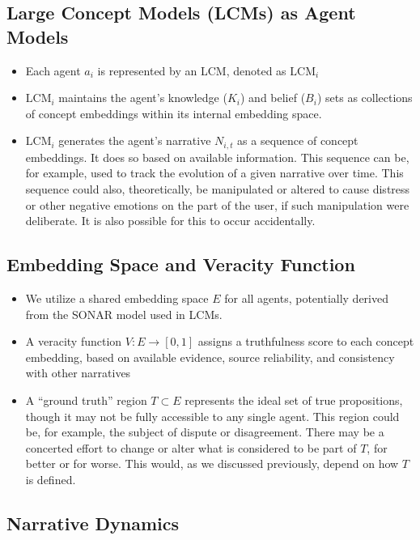 \documentclass[12pt, a4paper]{article}
\begin{document}
\subsection{Large Concept Models (LCMs) as Agent Models}

\begin{itemize}
    \item Each agent $a_i$ is represented by an LCM, denoted as $\text{LCM}_i$
    \item $\text{LCM}_i$ maintains the agent's knowledge ($K_i$) and belief ($B_i$) sets as collections of concept embeddings within its internal embedding space.
    \item $\text{LCM}_i$ generates the agent's narrative $N_{i,t}$ as a sequence of concept embeddings. It does so based on available information. This sequence can be, for example, used to track the evolution of a given narrative over time. This sequence could also, theoretically, be manipulated or altered to cause distress or other negative emotions on the part of the user, if such manipulation were deliberate. It is also possible for this to occur accidentally.
\end{itemize}

\subsection{Embedding Space and Veracity Function}

\begin{itemize}
    \item We utilize a shared embedding space $E$ for all agents, potentially derived from the SONAR model used in LCMs.
    \item A veracity function $V : E \rightarrow [0, 1]$ assigns a truthfulness score to each concept embedding, based on available evidence, source reliability, and consistency with other narratives
    \item A ``ground truth'' region $T \subset E$ represents the ideal set of true propositions, though it may not be fully accessible to any single agent. This region could be, for example, the subject of dispute or disagreement. There may be a concerted effort to change or alter what is considered to be part of $T$, for better or for worse. This would, as we discussed previously, depend on how $T$ is defined.
\end{itemize}

 

\subsection{Narrative Dynamics}
\end{document}
